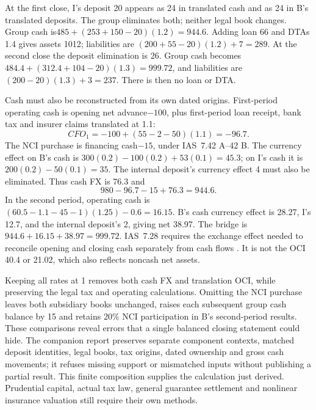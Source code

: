 At the first close, I's deposit 20 appears as 24 in translated cash and as 24
in B's translated deposits. The group eliminates both; neither legal book
changes. Group cash is\(485+(253+150-20)(1.2)=944.6\). Adding loan 66 and
DTAs 1.4 gives assets 1012; liabilities are
\((200+55-20)(1.2)+7=289\). At the second close the deposit elimination
is 26. Group cash becomes\(484.4+(312.4+104-20)(1.3)=999.72\), and liabilities
are\((200-20)(1.3)+3=237\). There is then no loan or DTA.

Cash must also be reconstructed from its own dated origins. First-period
operating cash is opening net advance\(-100\), plus first-period loan receipt,
bank tax and insurer claims translated at 1.1:
\begin{equation}
 CFO_1=-100+(55-2-50)(1.1)=-96.7.
\end{equation}
The NCI purchase is financing cash\(-15\), under IAS~7.42 A--42 B.
The currency effect on B's cash is
\(300(0.2)-100(0.2)+53(0.1)=45.3\); on I's cash it is
\(200(0.2)-50(0.1)=35\). The internal deposit's currency effect 4 must also
be eliminated. Thus cash FX is 76.3 and
\begin{equation}
 980-96.7-15+76.3=944.6.
\end{equation}
In the second period, operating cash is
\((60.5-1.1-45-1)(1.25)-0.6=16.15\). B's cash currency effect is 28.27,
I's 12.7, and the internal deposit's 2, giving net 38.97. The bridge is
\(944.6+16.15+38.97=999.72\). IAS~7.28 requires the exchange effect needed
to reconcile opening and closing cash separately from cash flows
\citep{eu 20231803}. It is not the OCI 40.4 or 21.02, which also reflects
noncash net assets.

Keeping all rates at 1 removes both cash FX and translation OCI, while
preserving the legal tax and operating calculations. Omitting the NCI purchase
leaves both subsidiary books unchanged, raises each subsequent group cash
balance by 15 and retains 20\% NCI participation in B's second-period results.
These comparisons reveal errors that a single balanced closing statement could
hide. The companion  report preserves separate component
contexts, matched deposit identities, legal books, tax origins, dated ownership
and gross cash movements; it refuses missing support or mismatched inputs
without publishing a partial result. This finite composition supplies the
calculation just derived. Prudential capital, actual tax law, general guarantee
settlement and nonlinear insurance valuation still require their own methods.

